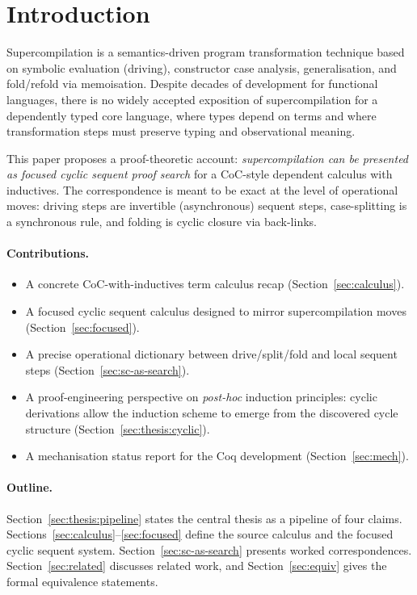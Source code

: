\section{Introduction}
\label{sec:intro}

Supercompilation is a semantics-driven program transformation technique based on symbolic evaluation (driving), constructor case analysis, generalisation, and fold/refold via memoisation.
Despite decades of development for functional languages, there is no widely accepted exposition of supercompilation for a dependently typed core language, where types depend on terms and where transformation steps must preserve typing and observational meaning.

This paper proposes a proof-theoretic account: \emph{supercompilation can be presented as focused cyclic sequent proof search} for a CoC-style dependent calculus with inductives.
The correspondence is meant to be exact at the level of operational moves: driving steps are invertible (asynchronous) sequent steps, case-splitting is a synchronous rule, and folding is cyclic closure via back-links.

\paragraph{Contributions.}
\begin{itemize}[leftmargin=*]
\item A concrete CoC-with-inductives term calculus recap (Section~\ref{sec:calculus}).
\item A focused cyclic sequent calculus designed to mirror supercompilation moves (Section~\ref{sec:focused}).
\item A precise operational dictionary between drive/split/fold and local sequent steps (Section~\ref{sec:sc-as-search}).
\item A proof-engineering perspective on \emph{post-hoc} induction principles: cyclic derivations allow the induction scheme to emerge from the discovered cycle structure (Section~\ref{sec:thesis:cyclic}).
\item A mechanisation status report for the Coq development (Section~\ref{sec:mech}).
\end{itemize}

\paragraph{Outline.}
Section~\ref{sec:thesis:pipeline} states the central thesis as a pipeline of four claims.
Sections~\ref{sec:calculus}--\ref{sec:focused} define the source calculus and the focused cyclic sequent system.
Section~\ref{sec:sc-as-search} presents worked correspondences.
Section~\ref{sec:related} discusses related work, and Section~\ref{sec:equiv} gives the formal equivalence statements.

